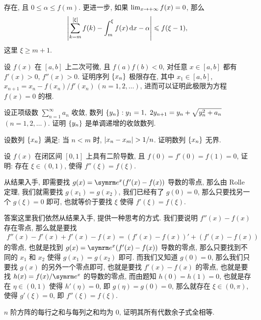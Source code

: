 \begin{exercise}[series=exer]
\begin{exercise}
      存在, 且 $ 0 \le \alpha \le f(m) $. 更进一步, 如果 $ \lim_{x \to +\infty} f(x) = 0 $, 那么
      \begin{align*}
          \abs{\sum_{k = m}^{[\xi]} f(k) - \int_{m}^{\xi} f(x) \dx* - \alpha} \le f(\xi - 1),
      \end{align*}
      这里 $ \xi \ge m + 1 $.
  \end{exercise}
  \item 设 $ f(x) $ 在 $ [a, b] $ 上二次可微, 且 $ f(a)f(b) < 0 $, 对任意 $ x \in [a, b] $ 都有 $ f'(x) > 0 $, $ f''(x) > 0 $. 证明序列 $ \qty{x_{n}} $ 极限存在, 其中 $ x_{1} \in [a, b] $, $ x_{n + 1} = x_{n} - f(x_{n})/f'(x_{n})\,(n = 1, 2, \dots) $, 进而可以证明此极限为方程 $ f(x) = 0 $ 的根.
  \item 设正项级数 $ \sum_{n = 1}^{\infty} a_{n} $ 收敛, 数列 $ \qty{y_{n}} : y_{1} = 1,\ 2y_{n + 1} = y_{n} + \sqrt{y_{n}^{2} + a_{n}} $\, $ (n = 1, 2, \dots) $. 证明 $ \qty{y_{n}} $ 是单调递增的收敛数列.
  \item 设数列 $ \qty{x_{n}} $ 满足: 当 $ n < m $ 时, $ \abs{x_{n} - x_{m}} > 1/n $. 证明数列 $ \qty{x_{n}} $ 无界.
  \item 设 $ f(x) $ 在闭区间 $ [0, 1] $ 上具有二阶导数, 且 $ f(0) = f'(0) = f(1) = 0 $, 证明: 存在 $ \xi \in (0, 1) $, 使得 $ f''(\xi) = f(\xi) $.
  \begin{hint}
      从结果入手, 即需要找 $ g(x) = \me^{x}(f'(x) - f(x)) $ 导数的零点, 那么由 Rolle 定理, 我们就需要找 $ g(x_{1}) = g(x_{2}) $, 我们已经有了 $ g(0) = 0 $, 那么只要找另一个 $ g(\xi) = 0 $ 即可, 也就等价于要找 $ \xi $ 使得 $ f'(\xi) = f(\xi) $.
  \end{hint}
  \begin{answer}
      答案这里我们依然从结果入手, 提供一种思考的方式. 我们要说明 $ f''(x) - f(x) $ 存在零点, 那么就是要找
      \begin{align*}
          f''(x) - f'(x) + f'(x) - f(x) = (f'(x) - f(x))' + (f'(x) - f(x))
      \end{align*}
      的零点, 也就是找到 $ g(x) = \me^{x}(f'(x) - f(x)) $ 导数的零点, 那么只要找到不同的 $ x_{1} $ 和 $ x_{2} $ 使得 $ g(x_{1}) = g(x_{2}) $ 即可. 而我们又知道 $ g(0) = 0 $, 那么我们只要找 $ g(x) $ 的另外一个零点即可, 也就是要找 $ f'(x) - f(x) $ 的零点, 也就是要找 $ h(x) = f(x)/\me^{x} $ 的导数的零点, 而由题知 $ h(0) = h(1) = 0 $, 也就是存在 $ \eta\in(0, 1) $ 使得 $ h'(\eta) = 0 $, 即 $ g(\eta) = g(0) = 0 $, 那么就存在 $ \xi \in (0, \pi) $, 使得 $ g'(\xi) = 0 $, 即 $ f''(\xi) = f(\xi) $.
  \end{answer}
  \item $ n $ 阶方阵的每行之和与每列之和均为 0, 证明其所有代数余子式全相等.

\end{exercise}
